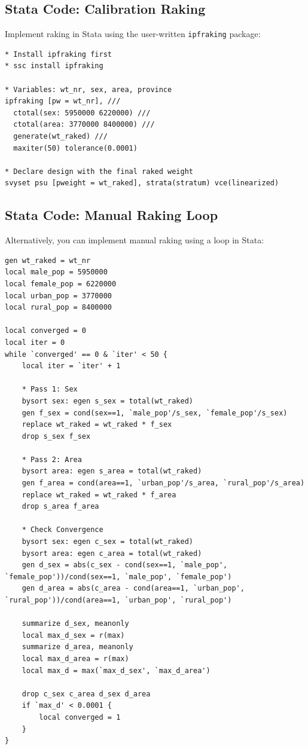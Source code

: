 \documentclass[11pt,a4paper]{article}
\begin{document}
\subsection{Stata Code: Calibration Raking}
Implement raking in Stata using the user-written \texttt{ipfraking} package:

\begin{lstlisting}[style=stata, caption={Raking Calibration in Stata}]
* Install ipfraking first
* ssc install ipfraking

* Variables: wt_nr, sex, area, province
ipfraking [pw = wt_nr], ///
  ctotal(sex: 5950000 6220000) ///
  ctotal(area: 3770000 8400000) ///
  generate(wt_raked) ///
  maxiter(50) tolerance(0.0001)

* Declare design with the final raked weight
svyset psu [pweight = wt_raked], strata(stratum) vce(linearized)
\end{lstlisting}

\newpage

\subsection{Stata Code: Manual Raking Loop}
Alternatively, you can implement manual raking using a loop in Stata:

\begin{lstlisting}[style=stata, caption={Manual Raking Loop in Stata}]
gen wt_raked = wt_nr
local male_pop = 5950000
local female_pop = 6220000
local urban_pop = 3770000
local rural_pop = 8400000

local converged = 0
local iter = 0
while `converged' == 0 & `iter' < 50 {
    local iter = `iter' + 1
    
    * Pass 1: Sex
    bysort sex: egen s_sex = total(wt_raked)
    gen f_sex = cond(sex==1, `male_pop'/s_sex, `female_pop'/s_sex)
    replace wt_raked = wt_raked * f_sex
    drop s_sex f_sex
    
    * Pass 2: Area
    bysort area: egen s_area = total(wt_raked)
    gen f_area = cond(area==1, `urban_pop'/s_area, `rural_pop'/s_area)
    replace wt_raked = wt_raked * f_area
    drop s_area f_area
    
    * Check Convergence
    bysort sex: egen c_sex = total(wt_raked)
    bysort area: egen c_area = total(wt_raked)
    gen d_sex = abs(c_sex - cond(sex==1, `male_pop', `female_pop'))/cond(sex==1, `male_pop', `female_pop')
    gen d_area = abs(c_area - cond(area==1, `urban_pop', `rural_pop'))/cond(area==1, `urban_pop', `rural_pop')
    
    summarize d_sex, meanonly
    local max_d_sex = r(max)
    summarize d_area, meanonly
    local max_d_area = r(max)
    local max_d = max(`max_d_sex', `max_d_area')
    
    drop c_sex c_area d_sex d_area
    if `max_d' < 0.0001 {
        local converged = 1
    }
}
\end{lstlisting}
\end{document}
